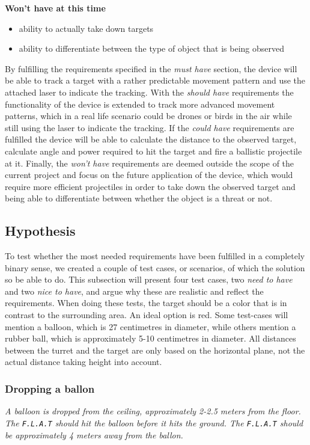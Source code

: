 \textbf{Won't have at this time}
\begin{itemize}
	\item ability to actually take down targets
	\item ability to differentiate between the type of object that is being observed
\end{itemize}

By fulfilling the requirements specified in the \textit{must have} section, the device will be able to track a target with a rather predictable movement pattern and use the attached laser to indicate the tracking. 
With the \textit{should have} requirements the functionality of the device is extended to track more advanced movement patterns, which in a real life scenario could be drones or birds in the air while still using the laser to indicate the tracking.
If the \textit{could have} requirements are fulfilled the device will be able to calculate the distance to the observed target, calculate angle and power required to hit the target and fire a ballistic projectile at it.
Finally, the \textit{won't have} requirements are deemed outside the scope of the current project and focus on the future application of the device, which would require more efficient projectiles in order to take down the observed target and being able to differentiate between whether the object is a threat or not.

\subsection{Hypothesis}
To test whether the most needed requirements have been fulfilled in a completely binary sense, we created a couple of test cases, or scenarios, of which the solution so be able to do. 
This subsection will present four test cases, two \textit{need to have} and two \textit{nice to have}, and argue why these are realistic and reflect the requirements.
When doing these tests, the target should be a color that is in contrast to the surrounding area.
An ideal option is red.
Some test-cases will mention a balloon, which is 27 centimetres in diameter, while others mention a rubber ball, which is approximately 5-10 centimetres in diameter.
All distances between the turret and the target are only based on the horizontal plane, not the actual distance taking height into account.

\subsubsection{Dropping a ballon}
\textit{A balloon is dropped from the ceiling, approximately 2-2.5 meters from the floor.	
The \texttt{F.L.A.T} should hit the balloon before it hits the ground.
The \texttt{F.L.A.T} should be approximately 4 meters away from the ballon.}

